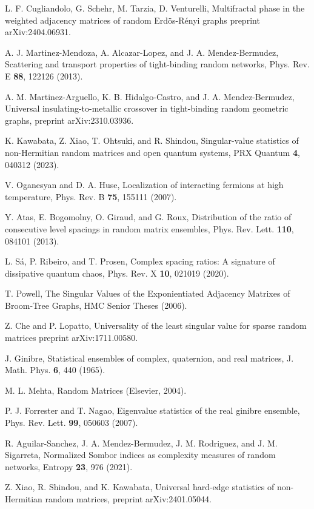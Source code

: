 \begin{thebibliography}{00}
L. F. Cugliandolo, G. Schehr, M. Tarzia, D. Venturelli,
Multifractal phase in the weighted adjacency matrices of random Erd\"os-R\'enyi graphs
preprint arXiv:2404.06931.

A. J. Martinez-Mendoza, A. Alcazar-Lopez, and J. A. Mendez-Bermudez,
Scattering and transport properties of tight-binding random networks, 
Phys. Rev. E {\bf 88}, 122126 (2013).

A. M. Martinez-Arguello, K. B. Hidalgo-Castro, and J. A. Mendez-Bermudez,
Universal insulating-to-metallic crossover in tight-binding random geometric graphs,
preprint arXiv:2310.03936. 

K. Kawabata, Z. Xiao, T. Ohtsuki, and R. Shindou,
Singular-value statistics of non-Hermitian random matrices and open quantum systems,
PRX Quantum {\bf 4}, 040312 (2023).

V. Oganesyan and D. A. Huse, 
Localization of interacting fermions at high temperature,
Phys. Rev. B {\bf 75}, 155111 (2007).

Y. Atas, E. Bogomolny, O. Giraud, and G. Roux, 
Distribution of the ratio of consecutive level spacings in random matrix ensembles,
Phys. Rev. Lett. {\bf 110}, 084101 (2013).

L. S\'a, P. Ribeiro, and T. Prosen, 
Complex spacing ratios: A signature of dissipative quantum chaos,
Phys. Rev. X {\bf 10}, 021019 (2020).

T. Powell, 
The Singular Values of the Exponientiated Adjacency Matrixes of Broom-Tree Graphs,
HMC Senior Theses (2006).

Z. Che and P. Lopatto,
Universality of the least singular value for sparse random matrices
 preprint arXiv:1711.00580.
 
J. Ginibre, 
Statistical ensembles of complex, quaternion, and real matrices,
J. Math. Phys. {\bf 6}, 440 (1965). 

M. L. Mehta, 
Random Matrices (Elsevier, 2004).

P. J. Forrester and T. Nagao, 
Eigenvalue statistics of the real ginibre ensemble,
Phys. Rev. Lett. {\bf 99}, 050603 (2007).

R. Aguilar-Sanchez, J. A. Mendez-Bermudez, J. M. Rodriguez, and J. M. Sigarreta,
Normalized Sombor indices as complexity measures of random networks,
Entropy {\bf 23}, 976 (2021).
      
Z. Xiao, R. Shindou, and K. Kawabata, 
Universal hard-edge statistics of non-Hermitian random matrices,
preprint arXiv:2401.05044.
      
\end{thebibliography}


